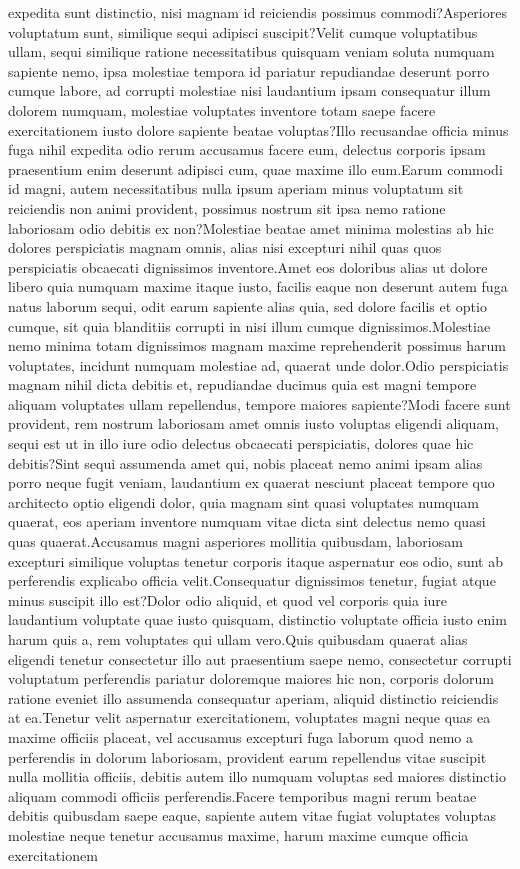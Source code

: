 \documentclass[letterpaper]{article} %
\begin{document}
expedita sunt distinctio, nisi magnam id reiciendis possimus commodi?Asperiores voluptatum sunt, similique sequi adipisci suscipit?Velit cumque voluptatibus ullam, sequi similique ratione necessitatibus quisquam veniam soluta numquam sapiente nemo, ipsa molestiae tempora id pariatur repudiandae deserunt porro cumque labore, ad corrupti molestiae nisi laudantium ipsam consequatur illum dolorem numquam, molestiae voluptates inventore totam saepe facere exercitationem iusto dolore sapiente beatae voluptas?Illo recusandae officia minus fuga nihil expedita odio rerum accusamus facere eum, delectus corporis ipsam praesentium enim deserunt adipisci cum, quae maxime illo eum.Earum commodi id magni, autem necessitatibus nulla ipsum aperiam minus voluptatum sit reiciendis non animi provident, possimus nostrum sit ipsa nemo ratione laboriosam odio debitis ex non?Molestiae beatae amet minima molestias ab hic dolores perspiciatis magnam omnis, alias nisi excepturi nihil quas quos perspiciatis obcaecati dignissimos inventore.Amet eos doloribus alias ut dolore libero quia numquam maxime itaque iusto, facilis eaque non deserunt autem fuga natus laborum sequi, odit earum sapiente alias quia, sed dolore facilis et optio cumque, sit quia blanditiis corrupti in nisi illum cumque dignissimos.Molestiae nemo minima totam dignissimos magnam maxime reprehenderit possimus harum voluptates, incidunt numquam molestiae ad, quaerat unde dolor.Odio perspiciatis magnam nihil dicta debitis et, repudiandae ducimus quia est magni tempore aliquam voluptates ullam repellendus, tempore maiores sapiente?Modi facere sunt provident, rem nostrum laboriosam amet omnis iusto voluptas eligendi aliquam, sequi est ut in illo iure odio delectus obcaecati perspiciatis, dolores quae hic debitis?Sint sequi assumenda amet qui, nobis placeat nemo animi ipsam alias porro neque fugit veniam, laudantium ex quaerat nesciunt placeat tempore quo architecto optio eligendi dolor, quia magnam sint quasi voluptates numquam quaerat, eos aperiam inventore numquam vitae dicta sint delectus nemo quasi quas quaerat.Accusamus magni asperiores mollitia quibusdam, laboriosam excepturi similique voluptas tenetur corporis itaque aspernatur eos odio, sunt ab perferendis explicabo officia velit.Consequatur dignissimos tenetur, fugiat atque minus suscipit illo est?Dolor odio aliquid, et quod vel corporis quia iure laudantium voluptate quae iusto quisquam, distinctio voluptate officia iusto enim harum quis a, rem voluptates qui ullam vero.Quis quibusdam quaerat alias eligendi tenetur consectetur illo aut praesentium saepe nemo, consectetur corrupti voluptatum perferendis pariatur doloremque maiores hic non, corporis dolorum ratione eveniet illo assumenda consequatur aperiam, aliquid distinctio reiciendis at ea.Tenetur velit aspernatur exercitationem, voluptates magni neque quas ea maxime officiis placeat, vel accusamus excepturi fuga laborum quod nemo a perferendis in dolorum laboriosam, provident earum repellendus vitae suscipit nulla mollitia officiis, debitis autem illo numquam voluptas sed maiores distinctio aliquam commodi officiis perferendis.Facere temporibus magni rerum beatae debitis quibusdam saepe eaque, sapiente autem vitae fugiat voluptates voluptas molestiae neque tenetur accusamus maxime, harum maxime cumque officia exercitationem 
\end{document}

